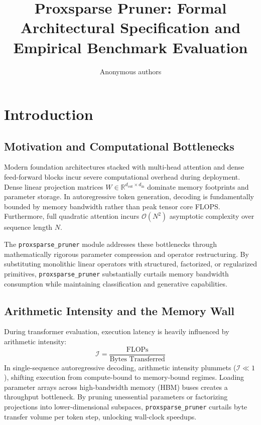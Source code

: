 \title{\textbf{Proxsparse Pruner: Formal Architectural Specification and Empirical Benchmark Evaluation}}

\author{Anonymous authors}


\section{Introduction}

\subsection{Motivation and Computational Bottlenecks}
Modern foundation architectures stacked with multi-head attention and dense feed-forward blocks incur severe computational overhead during deployment. Dense linear projection matrices $W \in \mathbb{R}^{d_{\text{out}} \times d_{\text{in}}}$ dominate memory footprints and parameter storage. In autoregressive token generation, decoding is fundamentally bounded by memory bandwidth rather than peak tensor core FLOPS. Furthermore, full quadratic attention incurs $\mathcal{O}(N^2)$ asymptotic complexity over sequence length $N$.

The \texttt{proxsparse\_pruner} module addresses these bottlenecks through mathematically rigorous parameter compression and operator restructuring. By substituting monolithic linear operators with structured, factorized, or regularized primitives, \texttt{proxsparse\_pruner} substantially curtails memory bandwidth consumption while maintaining classification and generative capabilities.

\subsection{Arithmetic Intensity and the Memory Wall}
During transformer evaluation, execution latency is heavily influenced by arithmetic intensity:
\[
\mathcal{I} = \frac{\text{FLOPs}}{\text{Bytes Transferred}}
\]
In single-sequence autoregressive decoding, arithmetic intensity plummets ($\mathcal{I} \ll 1$), shifting execution from compute-bound to memory-bound regimes. Loading parameter arrays across high-bandwidth memory (HBM) buses creates a throughput bottleneck. By pruning unessential parameters or factorizing projections into lower-dimensional subspaces, \texttt{proxsparse\_pruner} curtails byte transfer volume per token step, unlocking wall-clock speedups.

